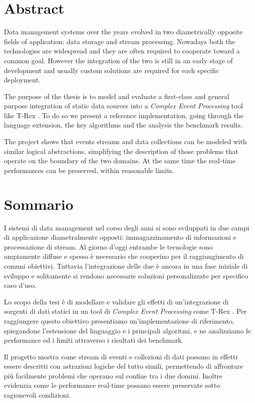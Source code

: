 \chapter*{Abstract}

Data management systems over the years evolved in two diametrically opposite fields of application: data storage and stream processing. Nowadays both the technologies are widespread and they are often required to cooperate toward a common goal. However the integration of the two is still in an early stage of development and usually custom solutions are required for each specific deployment.

The purpose of the thesis is to model and evaluate a first-class and general purpose integration of static data sources into a \emph{Complex Event Processing} tool like T-Rex \cite{trex}. To do so we present a reference implementation, going through the language extension, the key algorithms and the analysis the benchmark results.

The project shows that events streams and data collections can be modeled with similar logical abstractions, simplifying the description of those problems that operate on the boundary of the two domains. At the same time the real-time performances can be preserved, within reasonable limits.

\chapter*{Sommario}
I sistemi di data management nel corso degli anni si sono sviluppati in due campi di applicazione diametralmente opposti: immagazzinamento di informazioni e processazione di stream. Al giorno d'oggi entrambe le tecnologie sono ampiamente diffuse e spesso è necessario che cooperino per il raggiungimento di comuni obiettivi. Tuttavia l'integrazione delle due è ancora in una fase iniziale di sviluppo e solitamente si rendono necessarie soluzioni personalizzate per specifico caso d'uso.

Lo scopo della tesi è di modellare e validare gli effetti di un'in\-te\-gra\-zio\-ne di sorgenti di dati statici in un tool di \emph{Complex Event Processing} come T-Rex \cite{trex}. Per raggiungere questo obiettivo presentiamo un'implementazione di riferimento, spiegandone l'estensione del linguaggio e i principali algoritmi, e ne analizziamo le performance ed i limiti attraverso i risultati dei benchmark.

Il progetto mostra come stream di eventi e collezioni di dati possano in effetti essere descritti con astrazioni logiche del tutto simili, permettendo di affrontare più facilmente problemi che operano sul confine tra i due domini. Inoltre evidenzia come le performance real-time possano essere preservate sotto ragionevoli condizioni.
